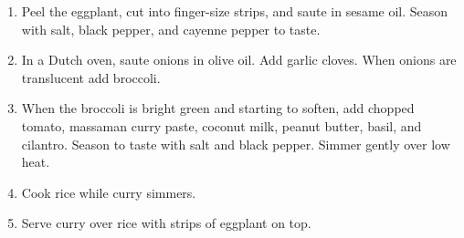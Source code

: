 
\begin{ingredients}
\end{ingredients}


\begin{recipe}
  \begin{enumerate}

  \item Peel the eggplant, cut into finger-size strips, and saute in
    sesame oil.  Season with salt, black pepper, and cayenne pepper to
    taste.

  \item In a Dutch oven, saute onions in olive oil.  Add garlic
    cloves.  When onions are translucent add broccoli.

  \item When the broccoli is bright green and starting to soften, add
    chopped tomato, massaman curry paste, coconut milk, peanut butter,
    basil, and cilantro.  Season to taste with salt and black pepper.
    Simmer gently over low heat.

  \item Cook rice while curry simmers.

  \item Serve curry over rice with strips of eggplant on top.

  \end{enumerate}
\end{recipe}
